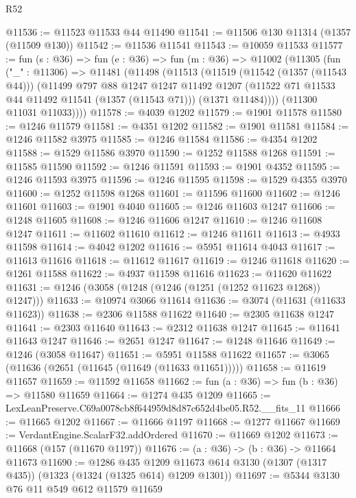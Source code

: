 \begin{lexlean}{R52}
\begin{coremodule}
@11536 := @11523 @11533 @44 @11490
@11541 := @11506 @130 @11314 (@1357 (@11509 @130))
@11542 := @11536 @11541
@11543 := @10059 @11533
@11577 := fun (s : @36) =>
  fun (e : @36) =>
  fun (m : @36) =>
  @11002
    (@11305
      (fun ("_" : @11306) =>
      @11481
        (@11498
          (@11513
            (@11519
              (@11542 (@1357 (@11543 @44)))
              (@11499
                @797
                @88
                @1247
                @1247
                @11492
                @1207
                (@11522 @71 @11533 @44 @11492 @11541 (@1357 (@11543 @71)))
                (@1371 @11484))))
          (@11300 @11031 @11033))))
@11578 := @4039 @1202
@11579 := @1901 @11578
@11580 := @1246 @11579
@11581 := @4351 @1202
@11582 := @1901 @11581
@11584 := @1246 @11582 @3975
@11585 := @1246 @11584
@11586 := @4354 @1202
@11588 := @1529 @11586 @3970
@11590 := @1252 @11588 @1268
@11591 := @11585 @11590
@11592 := @1246 @11591
@11593 := @1901 @4352
@11595 := @1246 @11593 @3975
@11596 := @1246 @11595
@11598 := @1529 @4355 @3970
@11600 := @1252 @11598 @1268
@11601 := @11596 @11600
@11602 := @1246 @11601
@11603 := @1901 @4040
@11605 := @1246 @11603 @1247
@11606 := @1248 @11605
@11608 := @1246 @11606 @1247
@11610 := @1246 @11608 @1247
@11611 := @11602 @11610
@11612 := @1246 @11611
@11613 := @4933 @11598
@11614 := @4042 @1202
@11616 := @5951 @11614 @4043
@11617 := @11613 @11616
@11618 := @11612 @11617
@11619 := @1246 @11618
@11620 := @1261 @11588
@11622 := @4937 @11598 @11616
@11623 := @11620 @11622
@11631 := @1246 (@3058 (@1248 (@1246 (@1251 (@1252 @11623 @1268)) @1247)))
@11633 := @10974 @3066 @11614
@11636 := @3074 (@11631 (@11633 @11623))
@11638 := @2306 @11588 @11622
@11640 := @2305 @11638 @1247
@11641 := @2303 @11640
@11643 := @2312 @11638 @1247
@11645 := @11641 @11643 @1247
@11646 := @2651 @1247
@11647 := @1248 @11646
@11649 := @1246 (@3058 @11647)
@11651 := @5951 @11588 @11622
@11657 := @3065 (@11636 (@2651 (@11645 (@11649 (@11633 @11651)))))
@11658 := @11619 @11657
@11659 := @11592 @11658
@11662 := fun (a : @36) => fun (b : @36) => @11580 @11659
@11664 := @1274 @435 @1209
@11665 := LexLeanPreserve.C69a0078cb8f644959d8d87c652d4be05.R52.__fits_11
@11666 := @11665 @1202
@11667 := @11666 @1197
@11668 := @1277 @11667
@11669 := VerdantEngine.ScalarF32.addOrdered
@11670 := @11669 @1202
@11673 := @11668 (@157 (@11670 @1197))
@11676 := (a : @36) -> (b : @36) -> @11664 @11673
@11690 := @1286
    @435
    @1209
    @11673
    @614
    @3130
    (@1307 (@1317 @435))
    (@1323 (@1324 (@1325 @614) @1209 @1301))
@11697 := @5344 @3130 @76 @11 @549 @612 @11579 @11659

\end{coremodule}
\end{lexlean}
